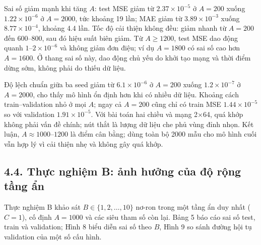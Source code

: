 \documentclass[12pt,a4paper]{article}
\begin{document}
Sai số giảm mạnh khi tăng $A$: test MSE giảm từ $2.37\times10^{-5}$ ở $A=200$ xuống $1.22\times10^{-6}$ ở $A=2000$, tức khoảng 19 lần; MAE giảm từ $3.89\times10^{-3}$ xuống $8.77\times10^{-4}$, khoảng 4.4 lần. Tốc độ cải thiện không đều: giảm nhanh từ $A=200$ đến $600$--$800$, sau đó hiệu suất biên giảm. Từ $A \ge 1200$, test MSE dao động quanh $1$--$2\times10^{-6}$ và không giảm đơn điệu; ví dụ $A=1800$ có sai số cao hơn $A=1600$. Ở thang sai số này, dao động chủ yếu do khởi tạo mạng và thời điểm dừng sớm, không phải do thiếu dữ liệu.

Độ lệch chuẩn giữa ba seed giảm từ $6.1\times10^{-6}$ ở $A=200$ xuống $1.2\times10^{-7}$ ở $A=2000$, cho thấy mô hình ổn định hơn khi có nhiều dữ liệu. Khoảng cách train--validation nhỏ ở mọi $A$; ngay cả $A=200$ cũng chỉ có train MSE $1.44\times10^{-5}$ so với validation $1.91\times10^{-5}$. Với bài toán hai chiều và mạng 2×64, quá khớp không phải vấn đề chính; nút thắt là lượng dữ liệu che phủ vùng đỉnh nhọn. Kết luận, $A \approx 1000$--$1200$ là điểm cân bằng; dùng toàn bộ 2000 mẫu cho mô hình cuối vẫn hợp lý vì cải thiện nhẹ và không gây quá khớp.

\subsection{4.4. Thực nghiệm B: ảnh hưởng của độ rộng tầng ẩn}

Thực nghiệm B khảo sát $B \in \{1, 2, \ldots, 10\}$ nơ-ron trong một tầng ẩn duy nhất ($C=1$), cố định $A=1000$ và các siêu tham số còn lại. Bảng 5 báo cáo sai số test, train và validation; Hình 8 biểu diễn sai số theo $B$, Hình 9 so sánh đường hội tụ validation của một số cấu hình.
\end{document}
